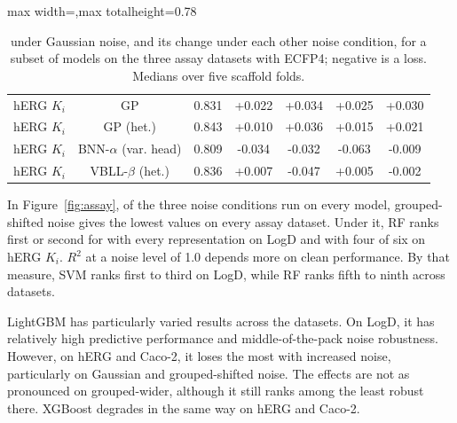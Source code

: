 \begin{table}[!htbp]
\begin{adjustbox}{max width=\textwidth,max totalheight=0.78\textheight}
\begin{tabular}{lcccccc}
hERG $K_i$ & GP & 0.831 & +0.022 & +0.034 & +0.025 & +0.030 \\
hERG $K_i$ & GP (het.) & 0.843 & +0.010 & +0.036 & +0.015 & +0.021 \\
hERG $K_i$ & BNN-$\alpha$ (var. head) & 0.809 & -0.034 & -0.032 & -0.063 & -0.009 \\
hERG $K_i$ & VBLL-$\beta$ (het.) & 0.836 & +0.007 & -0.047 & +0.005 & -0.002 \\
\bottomrule
\end{tabular}
\end{adjustbox}
\caption[Robustness under the noise distributions on the three assay datasets.]{\aucnorm{} under Gaussian noise, and its change under each other noise condition, for a subset of models on the three assay datasets with ECFP4; negative is a loss. Medians over five scaffold folds.}
\label{tab:assay_shape}
\end{table}

In Figure~\ref{fig:assay}, of the three noise conditions run on every model, grouped-shifted noise gives the lowest \aucnorm{} values on every assay dataset. Under it, RF ranks first or second for \aucnorm{} with every representation on LogD and with four of six on hERG $K_i$. $R^2$ at a noise level of 1.0 depends more on clean performance. By that measure, SVM ranks first to third on LogD, while RF ranks fifth to ninth across datasets.

LightGBM has particularly varied results across the datasets. On LogD, it has relatively high predictive performance and middle-of-the-pack noise robustness. However, on hERG and Caco-2, it loses the most with increased noise, particularly on Gaussian and grouped-shifted noise. The effects are not as pronounced on grouped-wider, although it still ranks among the least robust there. XGBoost degrades in the same way on hERG and Caco-2.

